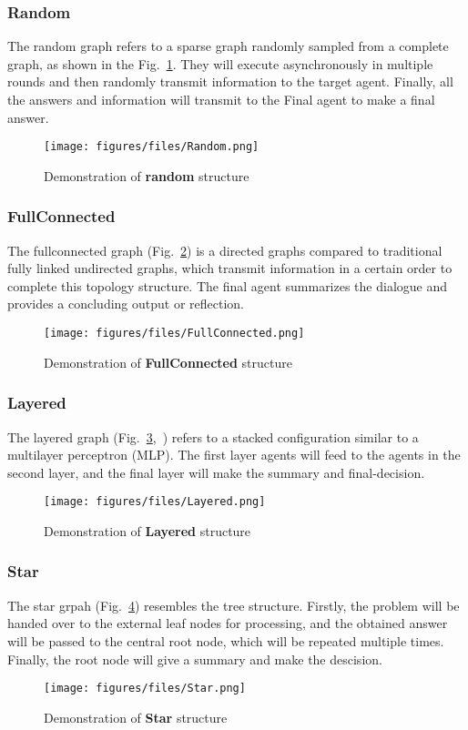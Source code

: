 \subsubsection{Random}
The random graph refers to a sparse graph randomly sampled from a complete graph, as shown in the Fig.~\ref{fig:random}. They will execute asynchronously in multiple rounds and then randomly transmit information to the target agent. Finally, all the answers and information will transmit to the Final agent to make a final answer.
\begin{figure}[!h] 
    \centering
    \texttt{[image: figures/files/Random.png]}
    \caption{
    Demonstration of \textbf{random} structure}
    \label{fig:random}
\end{figure}
\subsubsection{FullConnected}
The fullconnected graph (Fig.~\ref{fig:fullconnected}) is a directed graphs compared to traditional fully linked undirected graphs, which transmit information in a certain order to complete this topology structure. The final agent summarizes the dialogue and provides a concluding output or reflection.
\begin{figure}[!h] 
    \centering
    \texttt{[image: figures/files/FullConnected.png]}
    \caption{
    Demonstration of \textbf{FullConnected} structure}
    \label{fig:fullconnected}
\end{figure}
\subsubsection{Layered}
The layered graph (Fig.~\ref{fig:Layered},~\cite{qian2024scalinglargelanguagemodelbasedmultiagentcollaboration}) refers to a stacked configuration similar to a multilayer perceptron (MLP). The first layer agents will feed to the agents in the second layer, and the final layer will make the summary and final-decision.
\begin{figure}[!h] 
    \centering
    \texttt{[image: figures/files/Layered.png]}
    \caption{
    Demonstration of \textbf{Layered} structure}
    \label{fig:Layered}
\end{figure}
\subsubsection{Star}
The star grpah (Fig.~\ref{fig:Star}) resembles the tree structure. Firstly, the problem will be handed over to the external leaf nodes for processing, and the obtained answer will be passed to the central root node, which will be repeated multiple times. Finally, the root node will give a summary and make the descision.
\begin{figure}[!h] 
    \centering
    \texttt{[image: figures/files/Star.png]}
    \caption{
    Demonstration of \textbf{Star} structure}
    \label{fig:Star}
\end{figure}
